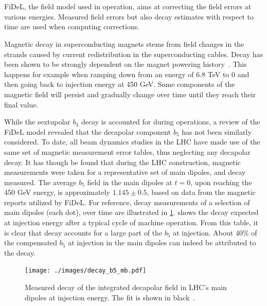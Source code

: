 \section{}
\label{section:decapoles:decay}

FiDeL, the field model used in operation, aims at correcting the field errors at various energies.
Measured field errors but also decay estimates with respect to time are used when computing
corrections.

Magnetic decay in superconducting magnets stems from field changes in the strands caused by current
redistribution in the superconducting cables. Decay has been shown to be strongly dependent on the
magnet powering history~\cite{sammut_mathematical_2006,haverkamp_studies_1999}.
This happens for example when ramping down from an energy of 6.8 TeV to 0 and then going back to
injection energy at 450 GeV. Some components of the magnetic field will persist and gradually change
over time until they reach their final value.

While the sextupolar $b_3$ decay is accounted for during operations, a review of the FiDeL model
revealed that the decapolar component $b_5$ has not been similarly considered. To date, all beam
dynamics studies in the LHC have made use of the same set of magnetic measurement error tables, thus
neglecting any decapolar decay. It has though be found that during the LHC construction, magnetic
measurements were taken for a representative set of main dipoles, and decay measured.
%
The average $b_5$ field in the main dipoles at $t=0$, upon reaching the 450 GeV energy, is
approximately $1.145 \pm 0.5$, based on data from the magnetic reports utilized by FiDeL. For
reference, decay measurements of a selection of main dipoles (each dot), over time are illustrated
in \cref{fig:decapoles:decay:decay_b5}.
%
 shows the decay expected at injection energy after a typical
cycle of machine operation. From this table, it is clear that decay accounts for a large part of the
$b_5$ at injection. About $40\%$ of the compensated $b_5$ at injection in the main dipoles can
indeed be attributed to the decay.

\begin{figure}[!htb]
    \centering
    \texttt{[image: ./images/decay\_b5\_mb.pdf]}
    \caption{Measured decay of the integrated decapolar field in LHC's main dipoles at injection
    energy. The fit is shown in black~\cite{deniau_magnetic_2009}.}
    \label{fig:decapoles:decay:decay_b5}
\end{figure}

